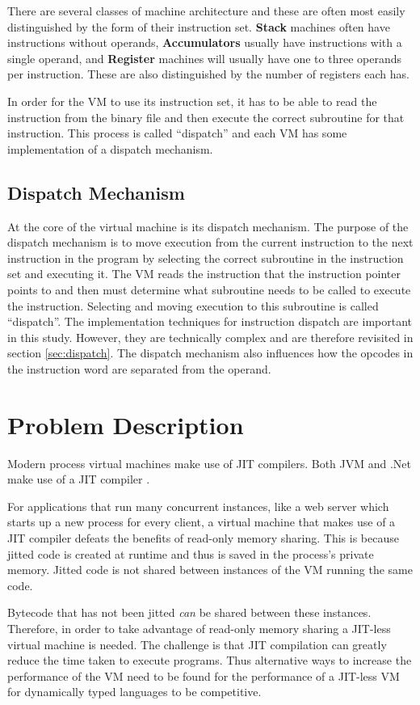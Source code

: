 \documentclass[english,a4paper,12pt]{report}
\begin{document}
There are several classes of machine architecture and these are often
most easily distinguished by the form of their instruction
set. \textbf{Stack} machines often have instructions without operands,
\textbf{Accumulators} usually have instructions with a single operand,
and \textbf{Register} machines will usually have one to three operands
per instruction. These are also distinguished by the number of
registers each has.

In order for the VM to use its instruction set, it has to be able to
read the instruction from the binary file and then execute the correct
subroutine for that instruction. This process is called ``dispatch''
and each VM has some implementation of a dispatch mechanism.

\subsection{Dispatch Mechanism} 
At the core of the virtual machine is its dispatch mechanism. The
purpose of the dispatch mechanism is to move execution from the
current instruction to the next instruction in the program by
selecting the correct subroutine in the instruction set and executing
it. The VM reads the instruction that the instruction pointer points
to and then must determine what subroutine needs to be called to
execute the instruction. Selecting and moving execution to this
subroutine is called ``dispatch''. The implementation techniques for
instruction dispatch are important in this study. However, they are
technically complex and are therefore revisited in section
\ref{sec:dispatch}. The dispatch mechanism also influences how the
opcodes in the instruction word are separated from the operand.

\section{Problem Description}
Modern process virtual machines make use of JIT compilers. Both JVM
and .Net make use of a JIT compiler \cite{MSDN,Oracle}. 

For applications that run many concurrent instances, like a web server
which starts up a new process for every client, a virtual machine that
makes use of a JIT compiler defeats the benefits of read-only memory
sharing. This is because jitted code is created at runtime and thus is
saved in the process's private memory. Jitted code is not shared
between instances of the VM running the same code.

Bytecode that has not been jitted \emph{can} be shared between these
instances. Therefore, in order to take advantage of read-only memory
sharing a JIT-less virtual machine is needed. The challenge is that
JIT compilation can greatly reduce the time taken to execute
programs. Thus alternative ways to increase the performance of the VM
need to be found for the performance of a JIT-less VM for dynamically
typed languages to be competitive.
\end{document}
